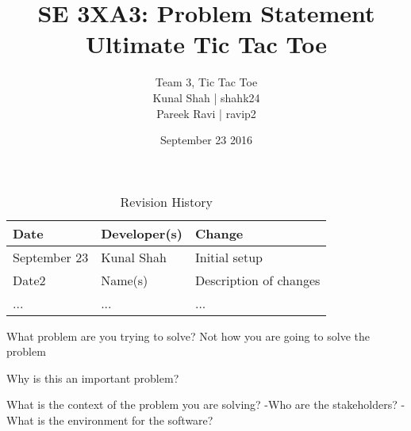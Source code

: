 \documentclass{article}
\title{SE 3XA3: Problem Statement\\Ultimate Tic Tac Toe }
\author{Team 3, Tic Tac Toe
		\\ Kunal Shah | shahk24
		\\ Pareek Ravi | ravip2
}
\date{September 23 2016}
\begin{document}
\begin{table}[hp]
\caption{Revision History} \label{TblRevisionHistory}
\begin{tabularx}{\textwidth}{llX}
\toprule
\textbf{Date} & \textbf{Developer(s)} & \textbf{Change}\\
\midrule
September 23 & Kunal Shah & Initial setup\\
Date2 & Name(s) & Description of changes\\
... & ... & ...\\
\bottomrule
\end{tabularx}
\end{table}

\newpage

\maketitle

What problem are you trying to solve?
Not how you are going to solve the problem

Why is this an important problem?

What is the context of the problem you are solving?
-Who are the stakeholders?
-What is the environment for the software?





\end{document}
